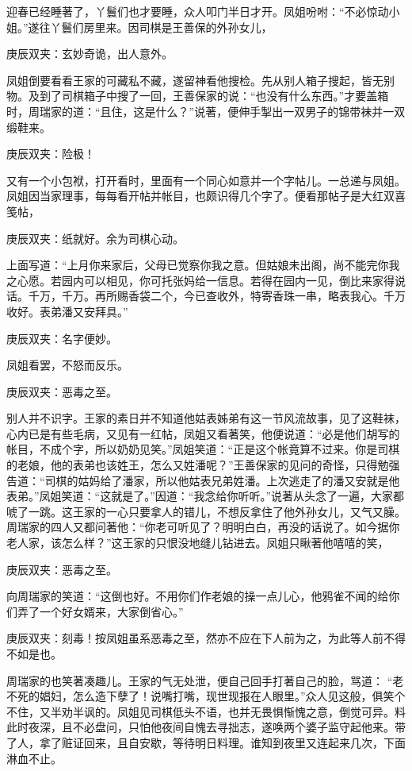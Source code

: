 \begin{parag}
    迎春已经睡著了，丫鬟们也才要睡，众人叩门半日才开。凤姐吩咐：“不必惊动小姐。”遂往丫鬟们房里来。因司棋是王善保的外孙女儿，\begin{note}庚辰双夹：玄妙奇诡，出人意外。\end{note}凤姐倒要看看王家的可藏私不藏，遂留神看他搜检。先从别人箱子搜起，皆无别物。及到了司棋箱子中搜了一回，王善保家的说：“也没有什么东西。”才要盖箱时，周瑞家的道：“且住，这是什么？”说著，便伸手掣出一双男子的锦带袜并一双缎鞋来。\begin{note}庚辰双夹：险极！\end{note}又有一个小包袱，打开看时，里面有一个同心如意并一个字帖儿。一总递与凤姐。凤姐因当家理事，每每看开帖并帐目，也颇识得几个字了。便看那帖子是大红双喜笺帖，\begin{note}庚辰双夹：纸就好。余为司棋心动。\end{note}上面写道：“上月你来家后，父母已觉察你我之意。但姑娘未出阁，尚不能完你我之心愿。若园内可以相见，你可托张妈给一信息。若得在园内一见，倒比来家得说话。千万，千万。再所赐香袋二个，今已查收外，特寄香珠一串，略表我心。千万收好。表弟潘又安拜具。”\begin{note}庚辰双夹：名字便妙。\end{note}凤姐看罢，不怒而反乐。\begin{note}庚辰双夹：恶毒之至。\end{note}别人并不识字。王家的素日并不知道他姑表姊弟有这一节风流故事，见了这鞋袜，心内已是有些毛病，又见有一红帖，凤姐又看著笑，他便说道：“必是他们胡写的帐目，不成个字，所以奶奶见笑。”凤姐笑道：“正是这个帐竟算不过来。你是司棋的老娘，他的表弟也该姓王，怎么又姓潘呢？”王善保家的见问的奇怪，只得勉强告道：“司棋的姑妈给了潘家，所以他姑表兄弟姓潘。上次逃走了的潘又安就是他表弟。”凤姐笑道：“这就是了。”因道：“我念给你听听。”说著从头念了一遍，大家都唬了一跳。这王家的一心只要拿人的错儿，不想反拿住了他外孙女儿，又气又臊。周瑞家的四人又都问著他：“你老可听见了？明明白白，再没的话说了。如今据你老人家，该怎么样？”这王家的只恨没地缝儿钻进去。凤姐只瞅著他嘻嘻的笑，\begin{note}庚辰双夹：恶毒之至。\end{note}向周瑞家的笑道：“这倒也好。不用你们作老娘的操一点儿心，他鸦雀不闻的给你们弄了一个好女婿来，大家倒省心。”\begin{note}庚辰双夹：刻毒！按凤姐虽系恶毒之至，然亦不应在下人前为之，为此等人前不得不如是也。\end{note}周瑞家的也笑著凑趣儿。王家的气无处泄，便自己回手打著自己的脸，骂道： “老不死的娼妇，怎么造下孽了！说嘴打嘴，现世现报在人眼里。”众人见这般，俱笑个不住，又半劝半讽的。凤姐见司棋低头不语，也并无畏惧惭愧之意，倒觉可异。料此时夜深，且不必盘问，只怕他夜间自愧去寻拙志，遂唤两个婆子监守起他来。带了人，拿了赃证回来，且自安歇，等待明日料理。谁知到夜里又连起来几次，下面淋血不止。
\end{parag}


